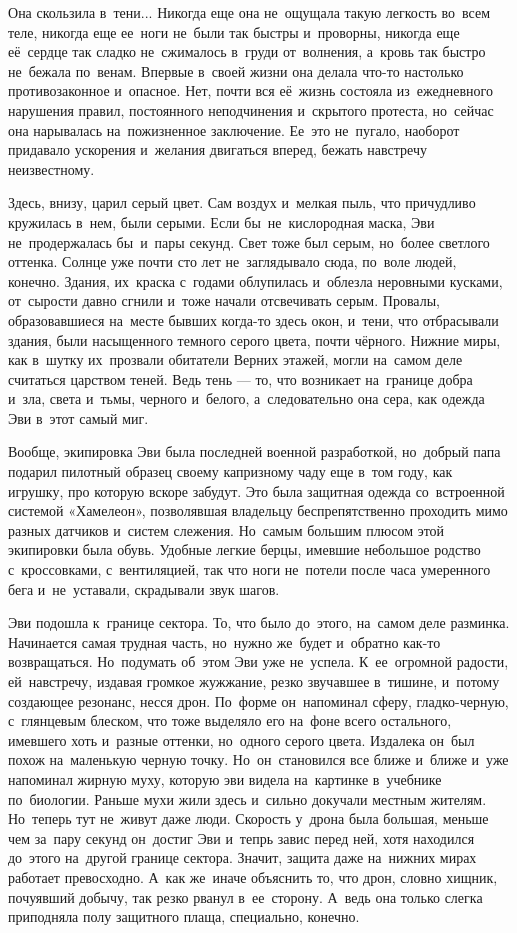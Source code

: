 

\lettrine[lines=3, loversize=0.1]{О}{}на скользила в~тени... Никогда еще она не~ощущала такую легкость во~всем теле, никогда еще ее~ноги не~были так быстры и~проворны, никогда еще её~сердце так сладко не~сжималось в~груди от~волнения, а~кровь так быстро не~бежала по~венам.
Впервые в~своей жизни она делала что-то настолько противозаконное и~опасное.
Нет, почти вся её~жизнь состояла из~ежедневного нарушения правил, постоянного неподчинения и~скрытого протеста, но~сейчас она нарывалась на~пожизненное заключение.
Ее~это не~пугало, наоборот придавало ускорения и~желания двигаться вперед, бежать навстречу неизвестному.

Здесь, внизу, царил серый цвет.
Сам воздух и~мелкая пыль, что причудливо кружилась в~нем, были серыми.
Если бы~не~кислородная маска, Эви не~продержалась бы~и~пары секунд.
Свет тоже был серым, но~более светлого оттенка.
Солнце уже почти сто лет не~заглядывало сюда, по~воле людей, конечно.
Здания, их~краска с~годами облупилась и~облезла неровными кусками, от~сырости давно сгнили и~тоже начали отсвечивать серым.
Провалы, образовавшиеся на~месте бывших когда-то здесь окон, и~тени, что отбрасывали здания, были насыщенного темного серого цвета, почти чёрного.
Нижние миры, как в~шутку их~прозвали обитатели Верних этажей, могли на~самом деле считаться царством теней.
Ведь тень --- то, что возникает на~границе добра и~зла, света и~тьмы, черного и~белого, а~следовательно она сера, как одежда Эви в~этот самый миг.
 
Вообще, экипировка Эви была последней военной разработкой, но~добрый папа подарил пилотный образец своему капризному чаду еще в~том году, как игрушку, про которую вскоре забудут.
Это была защитная одежда со~встроенной системой «Хамелеон», позволявшая владельцу беспрепятственно проходить мимо разных датчиков и~систем слежения.
Но~самым большим плюсом этой экипировки была обувь.
Удобные легкие берцы, имевшие небольшое родство с~кроссовками, с~вентиляцией, так что ноги не~потели после часа умеренного бега и~не~уставали, скрадывали звук шагов.

Эви подошла к~границе сектора.
То, что было до~этого, на~самом деле разминка.
Начинается самая трудная часть, но~нужно же~будет и~обратно как-то возвращаться.
Но~подумать об~этом Эви уже не~успела.
К~ее~огромной радости, ей~навстречу, издавая громкое жужжание, резко звучавшее в~тишине, и~потому создающее резонанс, несся дрон.
По~форме он~напоминал сферу, гладко-черную, с~глянцевым блеском, что тоже выделяло его на~фоне всего остального, имевшего хоть и~разные оттенки, но~одного серого цвета.
Издалека он~был похож на~маленькую черную точку.
Но~он~становился все ближе и~ближе и~уже напоминал жирную муху, которую эви видела на~картинке в~учебнике по~биологии.
Раньше мухи жили здесь и~сильно докучали местным жителям.
Но~теперь тут не~живут даже люди.
Скорость у~дрона была большая, меньше чем за~пару секунд он~достиг Эви и~тепрь завис перед ней, хотя находился до~этого на~другой границе сектора.
Значит, защита даже на~нижних мирах работает превосходно.
А~как же~иначе объяснить то, что дрон, словно хищник, почуявший добычу, так резко рванул в~ее~сторону.
А~ведь она только слегка приподняла полу защитного плаща, специально, конечно.
 
